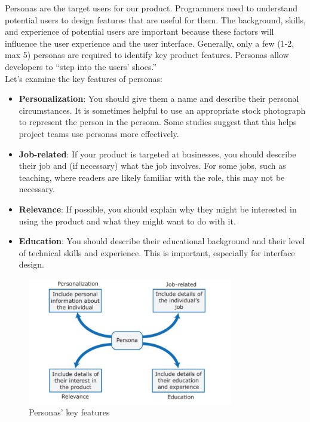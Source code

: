 Personas are the target users for our product. Programmers need to understand potential users to design features that are useful for them. The background, skills, and experience of potential users are important because these factors will influence the user experience and the user interface. Generally, only a few (1-2, max 5) personas are required to identify key product features. Personas allow developers to “step into the users' shoes.” \\

\noindent Let's examine the key features of personas:

\begin{itemize}
    \item \textbf{Personalization}: You should give them a name and describe their personal circumstances. It is sometimes helpful to use an appropriate stock photograph to represent the person in the persona. Some studies suggest that this helps project teams use personas more effectively.
    \item \textbf{Job-related}: If your product is targeted at businesses, you should describe their job and (if necessary) what the job involves. For some jobs, such as teaching, where readers are likely familiar with the role, this may not be necessary.
    \item \textbf{Relevance}: If possible, you should explain why they might be interested in using the product and what they might want to do with it.
    \item \textbf{Education}: You should describe their educational background and their level of technical skills and experience. This is important, especially for interface design.
\end{itemize}

\begin{figure} [H]
    \centering
    \includegraphics[width=0.8\textwidth]{images/Stories/personadescription.png}
    \caption{Personas' key features}
    \label{fig:personadescription}
\end{figure} 

